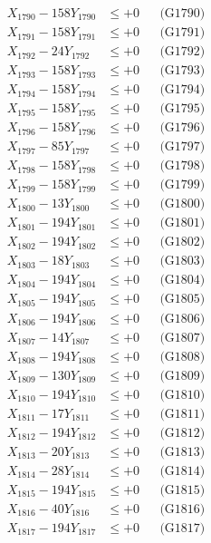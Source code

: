 \documentclass[a4paper,10pt]{article}
\begin{document}
{\begin{align}
X_{1790} - 158Y_{1790} &\leq +0 && \text{(G1790)} \\
\allowbreak
X_{1791} - 158Y_{1791} &\leq +0 && \text{(G1791)} \\
X_{1792} - 24Y_{1792} &\leq +0 && \text{(G1792)} \\
X_{1793} - 158Y_{1793} &\leq +0 && \text{(G1793)} \\
X_{1794} - 158Y_{1794} &\leq +0 && \text{(G1794)} \\
X_{1795} - 158Y_{1795} &\leq +0 && \text{(G1795)} \\
X_{1796} - 158Y_{1796} &\leq +0 && \text{(G1796)} \\
X_{1797} - 85Y_{1797} &\leq +0 && \text{(G1797)} \\
X_{1798} - 158Y_{1798} &\leq +0 && \text{(G1798)} \\
X_{1799} - 158Y_{1799} &\leq +0 && \text{(G1799)} \\
X_{1800} - 13Y_{1800} &\leq +0 && \text{(G1800)} \\
\allowbreak
X_{1801} - 194Y_{1801} &\leq +0 && \text{(G1801)} \\
X_{1802} - 194Y_{1802} &\leq +0 && \text{(G1802)} \\
X_{1803} - 18Y_{1803} &\leq +0 && \text{(G1803)} \\
X_{1804} - 194Y_{1804} &\leq +0 && \text{(G1804)} \\
X_{1805} - 194Y_{1805} &\leq +0 && \text{(G1805)} \\
X_{1806} - 194Y_{1806} &\leq +0 && \text{(G1806)} \\
X_{1807} - 14Y_{1807} &\leq +0 && \text{(G1807)} \\
X_{1808} - 194Y_{1808} &\leq +0 && \text{(G1808)} \\
X_{1809} - 130Y_{1809} &\leq +0 && \text{(G1809)} \\
X_{1810} - 194Y_{1810} &\leq +0 && \text{(G1810)} \\
\allowbreak
X_{1811} - 17Y_{1811} &\leq +0 && \text{(G1811)} \\
X_{1812} - 194Y_{1812} &\leq +0 && \text{(G1812)} \\
X_{1813} - 20Y_{1813} &\leq +0 && \text{(G1813)} \\
X_{1814} - 28Y_{1814} &\leq +0 && \text{(G1814)} \\
X_{1815} - 194Y_{1815} &\leq +0 && \text{(G1815)} \\
X_{1816} - 40Y_{1816} &\leq +0 && \text{(G1816)} \\
X_{1817} - 194Y_{1817} &\leq +0 && \text{(G1817)} \\

\end{align}}
\end{document}
